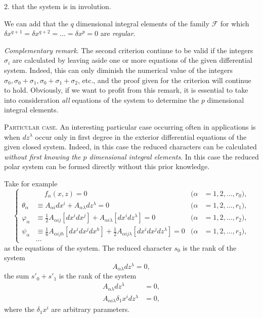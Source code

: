 \documentclass[leqno,11pt]{book}
\numberwithin{equation}{chapter}
\theoremstyle{shape1}
\theoremstyle{shape0}
\theoremstyle{shape2}
\theoremstyle{definition}
\begin{document}
2. that the system is in involution.

We can add that the $q$ dimensional integral elements of the family $\mathcal{F}$ for which $\delta x^{q+1}=\delta x^{q+2}=\dots=\delta x^{p}=0$ are \emph{regular}.


\vspace{12pt}\fsec \emph{Complementary remark}. The second criterion continue to be valid if the integers $\sigma_{i}$ are calculated by leaving aside one or more equations of the given differential system. Indeed, this can only diminish the numerical value of the integers $\sigma_{0},\sigma_{0}+\sigma_{1},\sigma_{0}+\sigma_{1}+\sigma_{2}$, etc., and the proof given for the criterion will continue to hold. Obviously, if we want to profit from this remark, it is essential to take into consideration \emph{all} equations of the system to determine the $p$ dimensional integral elements.

\vspace{12pt}\fsec \textsc{Particular case}. An interesting particular case occurring often in applications is when $dz^{\lambda}$ occur only in first degree in the exterior differential equations of the given closed system. Indeed, in this case the reduced characters can be calculated \emph{without first knowing the $p$ dimensional integral elements}. In this case the reduced polar system can be formed directly without this prior knowledge.

Take for example
\begin{equation}
  \label{eq:5.1}
  \left\{
  \begin{aligned}
    &\quad\ f_{\alpha}(x,z)=0&(\alpha&=1,2,\dots,r_{0}),\\
    \theta_{\alpha}&\equiv A_{\alpha i}dx^{i}+A_{\alpha\lambda}dz^{\lambda}=0&(\alpha&=1,2,\dots,r_{1}),\\
    \varphi_{\alpha}&\equiv \frac{1}{2}A_{\alpha ij}[dx^{i}dx^{j}]+A_{\alpha i \lambda}[dx^{i}dz^{\lambda}]=0&(\alpha&=1,2,\dots,r_{2}),\\
    \psi_{\alpha}&\equiv \frac{1}{6}A_{\alpha ijh}[dx^{i}dx^{j}dx^{h}]+\frac{1}{2}A_{\alpha ij\lambda}[dx^{i}dx^{j}dz^{\lambda}]=0&(\alpha&=1,2,\dots,r_{3}),\\
    &\dots
  \end{aligned}    
  \right.
\end{equation}
as the equations of the system. The reduced character $s_{0}$ is the rank of the system 
\[
A_{\alpha\lambda}dz^{\lambda}=0,
\]
the sum $s'_{0}+s'_{1}$ is the rank of the system
\begin{align*}
  A_{\alpha\lambda}dz^{\lambda}&=0,\\
  A_{\alpha i \lambda}\delta_{1}x^{i}dz^{\lambda}&=0,
\end{align*}
where the $\delta_{1}x^{i}$ are arbitrary parameters.
\end{document}
